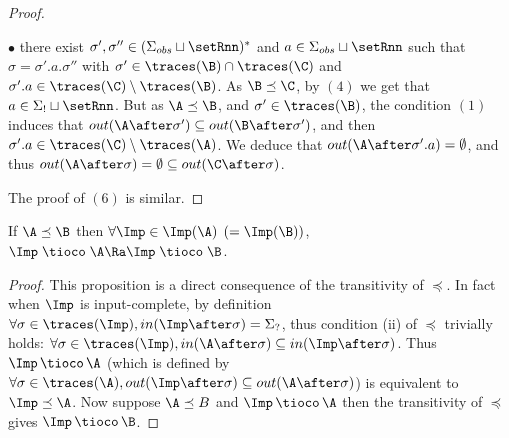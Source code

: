 \documentclass{LMCS}
\theoremstyle{plain}\newtheorem{proposition}[thm]{Proposition}
\begin{document}
\begin{proof}
\begin{iteMize}{$\bullet$}
there exist $\sigma', \sigma'' \in (\Sigma_{obs} \sqcup \setRnn)^*$ 
and $a\in \Sigma_{obs} \sqcup \setRnn$ such that 
$\sigma=\sigma'.a.\sigma''$ with $\sigma'\in \traces(\B) \cap \traces(\C)$ 
and   $\sigma'.a \in \traces(\C)\setminus \traces(\B)$.
As $\B \preceq \C$, by $(4)$ we get that $a \in \Sigma_! \sqcup \setRnn$. 
But as $\A \preceq \B$, and $\sigma' \in \traces(\B)$, 
the condition $(1)$ induces that $out(\A \after  \sigma')  \subseteq out(\B  \after \sigma')$,
and then $\sigma'.a \in \traces(\C)\setminus \traces(\A)$.
We deduce that  $out(\A \after  \sigma'.a)=\emptyset$,  and thus
 $out(\A \after  \sigma) = \emptyset \subseteq out(\C \after  \sigma)$.
\end{iteMize}
The proof of $(6)$ is similar.
\end{proof}



\begin{prop}
\label{prop:tioco-alt-sim}
If $\A \preceq \B$ then $\forall \Imp \in \Imp(\A)$ $(=\Imp(\B))$, 
$\Imp \; \tioco \; \A \Ra \Imp \; \tioco \; \B$.
\end{prop}
\begin{proof}


This proposition is a direct consequence of the transitivity of $\preceq$.
In fact when $\Imp$ is input-complete, by definition $\forall \sigma \in \traces(\Imp), in(\Imp \after \sigma) = \Sigma_?$, thus condition (ii) of $\preceq$ 
trivially holds:
$\forall \sigma \in \traces(\Imp), in(\A \after \sigma) \subseteq in(\Imp \after \sigma)$.
Thus $\Imp \,\tioco\, \A$ (which is defined by $\forall \sigma \in \traces(\A), out(\Imp \after \sigma) \subseteq out(\A \after \sigma)$) is equivalent to $\Imp \preceq \A$.
Now suppose $\A \preceq B$ and $\Imp \,\tioco\, \A$ then the transitivity of $\preceq$ gives $\Imp \,\tioco \,\B$.
\end{proof}
\end{document}
